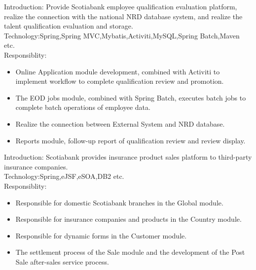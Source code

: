 \documentclass{resume}
\begin{document}
Introduction: Provide Scotiabank employee qualification evaluation platform, realize the connection with the national NRD database system, and realize the talent qualification evaluation and storage.\\
Technology:Spring,Spring MVC,Mybatis,Activiti,MySQL,Spring Batch,Maven etc.\\
Responsiblity:
\begin{itemize}
\item Online Application module development, combined with Activiti to implement workflow to complete qualification review and promotion.
\item The EOD jobs module, combined with Spring Batch, executes batch jobs to complete batch operations of employee data.
\item Realize the connection between External System and NRD database.
\item Reports module, follow-up report of qualification review and review display.
\end{itemize}
Introduction: Scotiabank provides insurance product sales platform to third-party insurance companies.\\
Technology:Spring,eJSF,eSOA,DB2 etc.\\
Responsiblity:
\begin{itemize}
\item Responsible for domestic Scotiabank branches in the Global module.
\item Responsible for insurance companies and products in the Country module.
\item Responsible for dynamic forms in the Customer module.
\item The settlement process of the Sale module and the development of the Post Sale after-sales service process.
\end{itemize}
\end{document}
